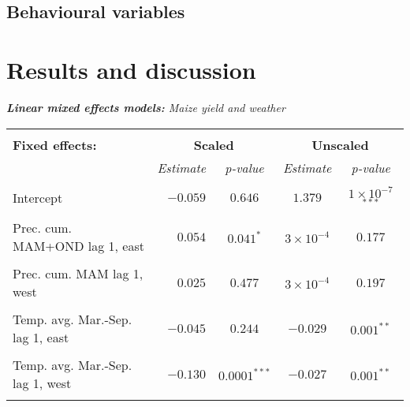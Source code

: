 \documentclass[a4paper,12pt]{article}
\begin{document}
\vspace{1cm}







\subsection{Behavioural variables}\label{BehaviouralVars}




\FloatBarrier
	\section{Results and discussion}\label{Results}



{\centering
\begin{threeparttable}


\singlespacing
\caption{\textit{\textbf{Linear mixed effects models:} Maize yield and weather}}
\label{Peggy45} 
\centering
\begin{small}
\begin{tabular}{lrccc} 
\hline \vspace{-0.2cm} \\
  
  
  \multicolumn{1}{l}{\vspace{0.1cm}\textbf{Fixed effects:}}  &\multicolumn{2}{c}{\textbf{Scaled}}& \multicolumn{2}{c}{{\textbf{Unscaled\tnote{a}}}} \\
  
    \multicolumn{1}{l}{\vspace{0.1cm}}  &\textit{Estimate}&\textit{p-value}&\multicolumn{1}{c}{\textit{Estimate}}& \multicolumn{1}{c}{\textit{p-value}} \\
 \hline 
\hline
\\
\vspace{-0.2cm}Intercept&$-0.059$&$0.646$&$1.379$&$1\times10^{-7}$$^{***}$\\
  \\
\vspace{-0.2cm}Prec. cum. MAM+OND lag 1, east&$0.054$&$0.041^{*}$&$3\times10^{-4}$&$0.177$\\
  \\
  \vspace{-0.2cm}Prec. cum. MAM lag 1, west&$0.025$&$0.477$&$3\times10^{-4}$&$0.197$\\
  \\
  \vspace{-0.2cm}Temp. avg. Mar.-Sep. lag 1, east&$-0.045$&$0.244$&$-0.029$&$0.001^{**}$\\
  \\
    \vspace{-0.2cm}Temp. avg. Mar.-Sep. lag 1, west&$-0.130$&$0.0001^{***}$&$-0.027$&$0.001^{**}$\\
  \\
  

\end{tabular}
\end{small}
\end{threeparttable}}
\end{document}
